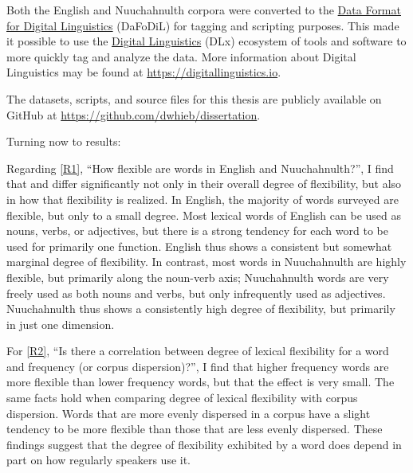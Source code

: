 Both the English and Nuuchahnulth corpora were converted to the \href{https://format.digitallinguistics.io}{Data Format for Digital Linguistics} (DaFoDiL)  for tagging and scripting purposes. This made it possible to use the \href{https://digitallinguistics.io}{Digital Linguistics} (DLx) ecosystem of tools and software to more quickly tag and analyze the data. More information about Digital Linguistics may be found at \url{https://digitallinguistics.io}.

The datasets, scripts, and source files for this thesis are publicly available on GitHub at \url{https://github.com/dwhieb/dissertation}.

Turning now to results:

Regarding \ref{R1}, \enquote{How flexible are words in English and Nuuchahnulth?}, I find that  and  differ significantly not only in their overall degree of flexibility, but also in how that flexibility is realized. In English, the majority of words surveyed are flexible, but only to a small degree. Most lexical words of English can be used as nouns, verbs, or adjectives, but there is a strong tendency for each word to be used for primarily one function. English thus shows a consistent but somewhat marginal degree of flexibility. In contrast, most words in Nuuchahnulth are highly flexible, but primarily along the noun-verb axis; Nuuchahnulth words are very freely used as both nouns and verbs, but only infrequently used as adjectives. Nuuchahnulth thus shows a consistently high degree of flexibility, but primarily in just one dimension.

For \ref{R2}, \enquote{Is there a correlation between degree of lexical flexibility for a word and frequency (or corpus dispersion)?}, I find that higher frequency words are more flexible than lower frequency words, but that the effect is very small. The same facts hold when comparing degree of lexical flexibility with corpus dispersion. Words that are more evenly dispersed in a corpus have a slight tendency to be more flexible than those that are less evenly dispersed. These findings suggest that the degree of flexibility exhibited by a word does depend in part on how regularly speakers use it.

